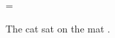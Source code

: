 



\footline={}

\pdfinterwordspaceon
The cat 
\pdffakespace
{}%
sat on the %
\pdffakespace
{}%
%
mat%
%
.

\bye
